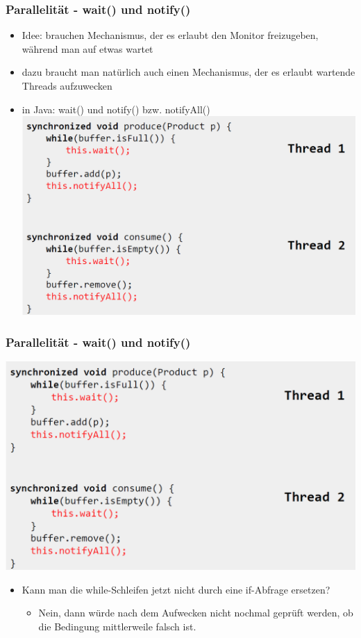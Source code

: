 \documentclass[18pt]{beamer}
\begin{document}
	\begin{frame}
		\frametitle{Parallelität - wait() und notify()}
		\begin{itemize}
			\item Idee: brauchen Mechanismus, der es erlaubt den Monitor freizugeben, während man auf etwas wartet \pause
			\item dazu braucht man natürlich auch einen Mechanismus, der es erlaubt wartende Threads aufzuwecken \pause
			\item in Java: wait() und notify() bzw. notifyAll() \pause
			\includegraphics[scale=0.3]{./pics/tut5/cons-prod-sol.png}
		\end{itemize}
	\end{frame}

	\begin{frame}
		\frametitle{Parallelität - wait() und notify()}
		\includegraphics[scale=0.3]{./pics/tut5/cons-prod-sol.png}
		\begin{itemize}
			\item Kann man die while-Schleifen jetzt nicht durch eine if-Abfrage ersetzen? \pause
			\begin{itemize}
				\item Nein, dann würde nach dem Aufwecken nicht nochmal geprüft werden, ob die Bedingung mittlerweile falsch ist.
			\end{itemize}
		\end{itemize}
	\end{frame}
\end{document}
